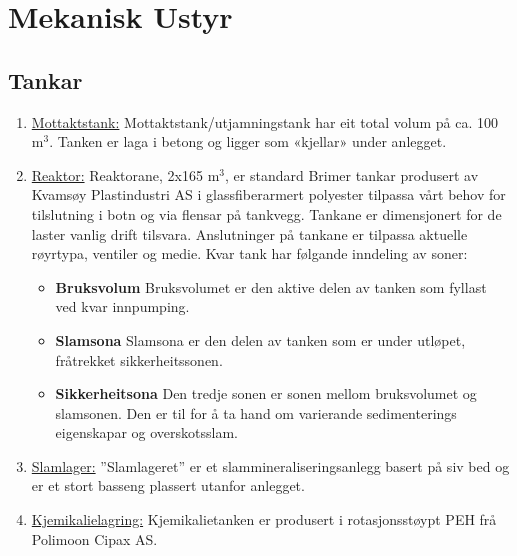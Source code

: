 \newpage
\section{Mekanisk Ustyr}
\subsection{Tankar}

\begin{enumerate}
    \item \underline{Mottaktstank:} \newline
    Mottaktstank/utjamningstank har eit total volum på ca. 100 \(\text{m}^3\). Tanken er laga i betong og ligger som «kjellar» under anlegget.
    \item \underline{Reaktor:} \newline
    Reaktorane, 2x165 \(\text{m}^3\), er standard Brimer tankar produsert av Kvamsøy Plastindustri AS i glassfiberarmert polyester tilpassa vårt behov for tilslutning i botn og via flensar på tankvegg. 
    Tankane er dimensjonert for de laster vanlig drift tilsvara.  Anslutninger på tankane er tilpassa aktuelle røyrtypa, ventiler og medie.  
    Kvar tank har følgande inndeling av soner:
    \begin{itemize}
        \item \textbf{Bruksvolum} \newline
        Bruksvolumet er den aktive delen av tanken som fyllast ved kvar innpumping.
        \item \textbf{Slamsona} \newline
        Slamsona er den delen av tanken som er under utløpet, fråtrekket sikkerheitssonen.
        \item \textbf{Sikkerheitsona}
        Den tredje sonen er sonen mellom bruksvolumet og slamsonen. Den er til for å ta hand om varierande sedimenterings eigenskapar og overskotsslam.
    \end{itemize}
    \item \underline{Slamlager:} \newline
    ”Slamlageret” er et slammineraliseringsanlegg basert på siv bed og er et stort basseng plassert utanfor anlegget.    
    \item \underline{Kjemikalielagring:} \newline
    Kjemikalietanken er produsert i rotasjonsstøypt PEH frå Polimoon Cipax AS.
\end{enumerate}

\newpage
